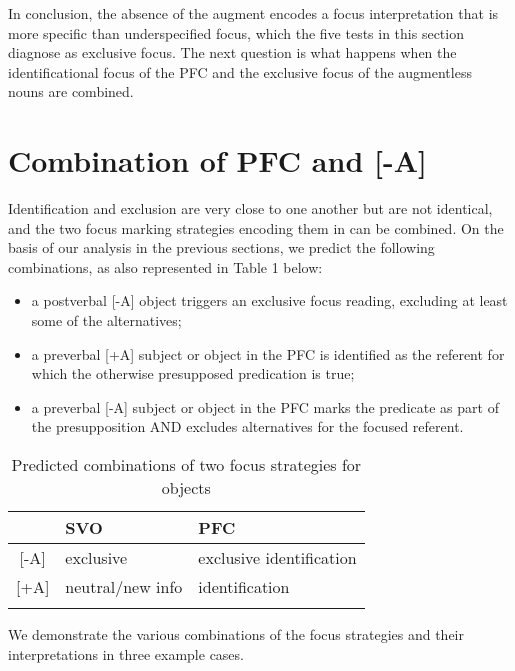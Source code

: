 \documentclass[output=paper]{langsci/langscibook}
\begin{document}
  In conclusion, the absence of the augment encodes a focus interpretation that is more specific than  underspecified focus, which the five tests in this section diagnose as exclusive focus. The next question is what happens when the identificational focus of the PFC and the exclusive focus of the augmentless nouns are combined.

\section{Combination of PFC and [-A]}\label{sec:vanderwal:5}
 
Identification and exclusion are very close to one another but are not identical, and the two focus marking strategies encoding them in  can be combined. On the basis of our analysis in the previous sections, we predict the following combinations, as also represented in Table 1 below:

\begin{itemize}[noitemsep]
 \item a postverbal [-A] object triggers an exclusive focus reading, excluding at least some of the alternatives;
 \item a preverbal [+A] subject or object in the PFC is identified as the referent for which the otherwise presupposed predication is true;
 \item a preverbal [-A] subject or object in the PFC marks the predicate as part of the presupposition AND excludes alternatives for the focused referent.
\end{itemize} 

\begin{table}
\caption{Predicted combinations of two focus strategies for  objects}
\begin{tabular}{cll} 
\lsptoprule
& {{SVO}} & {{PFC}}\\ 
\midrule{}
[-A] & {\mdseries exclusive} & {\mdseries exclusive identification}\\{}
[+A] & {\mdseries neutral/new info} & {\mdseries identification}\\
\lspbottomrule
\end{tabular}
\end{table}

We demonstrate the various combinations of the focus strategies and their interpretations in three example cases.
\end{document}
